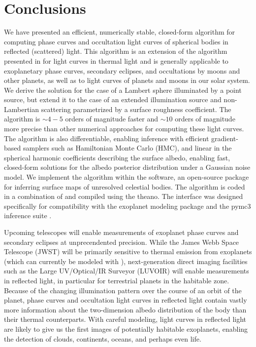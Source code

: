 \documentclass[modern]{aastex62}
\begin{document}
\section{Conclusions}
\label{sec:conclusions}

We have presented an efficient, numerically stable,
closed-form algorithm for computing phase curves
and occultation light curves of spherical bodies in reflected
(scattered) light.
This algorithm is an extension of the algorithm presented
in \citet{Luger2019} for light curves in thermal light and
is generally applicable to exoplanetary phase
curves, secondary eclipses, and occultations by moons and other planets,
as well as to light curves of planets and moons in our solar system.
We derive the solution for the case of a Lambert sphere illuminated by a
point source, but extend it to the case of an extended illumination
source and non-Lambertian scattering parametrized by a surface roughness
coefficient.
%
The algorithm is ${\sim}4-5$ orders of magnitude faster
and ${\sim}10$ orders of magnitude more precise than other numerical
approaches for computing these light curves. The algorithm is
also differentiable, enabling inference with efficient gradient-based samplers
such as Hamiltonian Monte Carlo (HMC), and linear in the spherical
harmonic coefficients describing the surface albedo, enabling fast,
closed-form solutions for the albedo posterior distribution under a
Gaussian noise model.
%
We implement the algorithm within the \starry software, an open-source \Python
package for inferring surface maps of unresolved celestial bodies. The
algorithm is coded in a combination of \cpp and \Python compiled using
the \textsf{theano}. The interface was designed specifically for
compatibility with the \textsf{exoplanet} modeling package
\citep{exoplanet} and the \textsf{pymc3} inference suite \citep{pymc3}.

Upcoming telescopes will enable measurements of exoplanet phase curves
and secondary eclipses at unprecendented precision. While the
James Webb Space Telescope (JWST) will be primarily sensitive to thermal
emission from exoplanets (which can currently be modeled with \starry),
next-generation direct imaging facilities such as the
Large UV/Optical/IR Surveyor (LUVOIR)
will enable measurements in reflected light, in particular for terrestrial
planets in the habitable zone. Because of the changing illumination
pattern over the course of an orbit of the planet, phase curves and
occultation light curves in reflected
light contain vastly more information about the two-dimension albedo
distribution of the body than their thermal counterparts.
With careful modeling, light curves in reflected light are likely to give us
the first images of potentially habitable exoplanets, enabling the
detection of clouds, continents, oceans, and perhaps even life.
\end{document}
